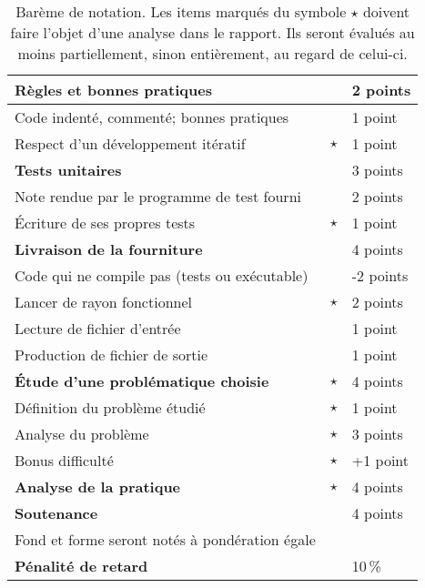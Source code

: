 \documentclass[10pt, a4paper ]{article}
\begin{document}
\begin{table}
    \centering
    \begin{tabular}[ht]{|lcl|}
        \hline
        \textbf{Règles et bonnes pratiques} && 2 points\\\hline
        Code indenté, commenté; bonnes pratiques && 1 point\\
        Respect d'un développement itératif &$\star$& 1 point \\\hline\hline
        \textbf{Tests unitaires} && 3 points\\\hline
        Note rendue par le programme de test fourni && 2 points\\
        Écriture de ses propres tests & $\star$  & 1 point\\\hline\hline
        \textbf{Livraison de la fourniture} && 4 points\\\hline
        Code qui ne compile pas (tests ou exécutable) && {\color{red} -2 points}\\
        Lancer de rayon fonctionnel & $\star$ & 2 points\\
        Lecture de fichier d'entrée && 1 point\\
        Production de fichier de sortie && 1 point\\\hline\hline
        \textbf{Étude d'une problématique choisie} & $\star$ & 4 points\\\hline
        Définition du problème étudié & $\star$ & 1 point \\
        Analyse du problème & $\star$ & 3 points \\
        Bonus difficulté & $\star$ & +1 point \\\hline\hline
        \textbf{Analyse de la pratique} & $\star$ & 4 points\\\hline\hline
        \textbf{Soutenance} & & 4 points\\\hline
        Fond et forme seront notés à pondération égale &&\\\hline\hline
        \textbf{Pénalité de retard} & & 10\,\%\\\hline

    \end{tabular}

    \caption{Barème de notation. Les items marqués du symbole $\star$ doivent
    faire l'objet d'une analyse dans le rapport. Ils seront évalués au moins
partiellement, sinon entièrement,  au regard de celui-ci.}

    \label{tab:bareme}
\end{table}
\end{document}
